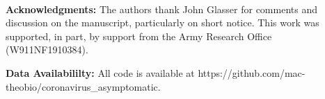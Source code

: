 \mbox{}\\
\noindent
\textbf{Acknowledgments:} The authors thank John Glasser for comments
and discussion on the manuscript, particularly on short notice. 
This work was supported, in part,
by support from the Army Research Office (W911NF1910384).

\noindent
\textbf{Data Availabililty:} All code is available at https://github.com/mac-theobio/coronavirus\_asymptomatic.
